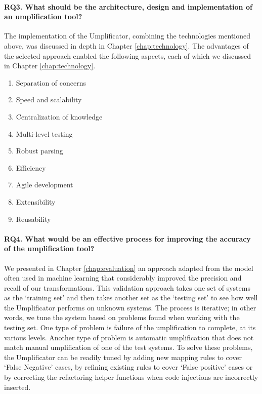 \paragraph*{RQ3. What should be the architecture, design and implementation of an umplification tool?}

The implementation of the Umplificator, combining the technologies mentioned above, was discussed in depth in Chapter \ref{chap:technology}. The advantages of the selected approach enabled the following aspects, each of which we discussed in Chapter \ref{chap:technology}.

\begin{enumerate}

\item Separation of concerns

\item Speed and scalability

\item Centralization of knowledge

\item Multi-level testing

\item Robust parsing 

\item Efficiency

\item Agile development 

\item Extensibility

\item Reusability

\end{enumerate}

\paragraph*{RQ4. What would be an effective process for improving the accuracy of the umplification tool?}

We presented in Chapter \ref{chap:evaluation} an approach adapted from the model often used in machine learning that  considerably improved the precision and recall of our transformations. This validation approach takes one set of systems as the `training set' and then takes another set as the `testing set' to see how well the Umplificator performs on unknown systems. The process is iterative; in other words, we tune the system based on problems found when working with the testing set. 
One type of problem is  failure of the umplification to complete, at its various levels. Another type of problem is automatic umplification that does not match manual umplification of one of the test systems. To solve these problems, the Umplificator can be readily tuned by adding new mapping rules to cover `False Negative' cases, by refining existing rules to cover `False positive' cases or by correcting the refactoring helper functions when code injections are incorrectly inserted.

